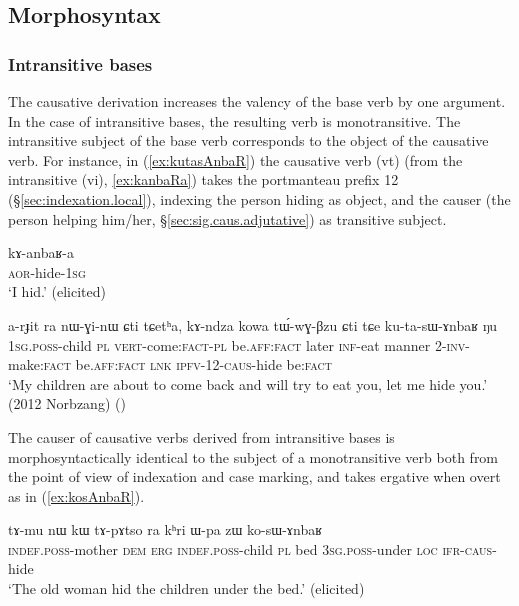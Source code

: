  

\subsection{Morphosyntax} \label{sec:sig.caus.morphosyntax}

\subsubsection{Intransitive bases} \label{sec:sig.caus.intr}
The causative derivation increases the valency of the base verb by one argument. In the case of intransitive bases, the resulting verb is monotransitive. The intransitive subject of the base verb  corresponds to the object of the causative verb. For instance, in (\ref{ex:kutasAnbaR}) the causative verb  (vt) (from the intransitive  (vi), \ref{ex:kanbaRa})  takes the portmanteau prefix 1\fl{}2  (§\ref{sec:indexation.local}), indexing the person hiding as object, and the causer (the person helping him/her, §\ref{sec:sig.caus.adjutative}) as transitive subject.


\begin{exe}
\ex \label{ex:kanbaRa}
\gll kɤ-anbaʁ-a \\
\textsc{aor}-hide-\textsc{1sg} \\
\glt `I hid.' (elicited)
\end{exe}

\begin{exe}
\ex \label{ex:kutasAnbaR}
\gll a-rɟit ra nɯ-ɣi-nɯ ɕti tɕetʰa, kɤ-ndza kowa tɯ́-wɣ-βzu ɕti tɕe ku-ta-sɯ-ɤnbaʁ ŋu \\
\textsc{1sg}.\textsc{poss}-child \textsc{pl} \textsc{vert}-come:\textsc{fact}-\textsc{pl} be.\textsc{aff}:\textsc{fact} later \textsc{inf}-eat manner 2-\textsc{inv}-make:\textsc{fact} be.\textsc{aff}:\textsc{fact} \textsc{lnk} \textsc{ipfv}-1\fl{}2-\textsc{caus}-hide be:\textsc{fact} \\
\glt `My children are about to come back and will try to eat you, let me hide you.' (2012 Norbzang)
()
\end{exe}
 
The causer of causative verbs derived from intransitive bases is morphosyntactically identical to the subject of a monotransitive verb both from the point of view of indexation and case marking, and takes ergative when overt as in (\ref{ex:kosAnbaR}).

\begin{exe}
\ex \label{ex:kosAnbaR}
\gll tɤ-mu nɯ kɯ  tɤ-pɤtso ra kʰri ɯ-pa zɯ ko-sɯ-ɤnbaʁ  \\
\textsc{indef}.\textsc{poss}-mother \textsc{dem} \textsc{erg} \textsc{indef}.\textsc{poss}-child \textsc{pl} bed \textsc{3sg}.\textsc{poss}-under \textsc{loc} \textsc{ifr}-\textsc{caus}-hide \\
\glt `The old woman hid the children under the bed.' (elicited)
\end{exe}

